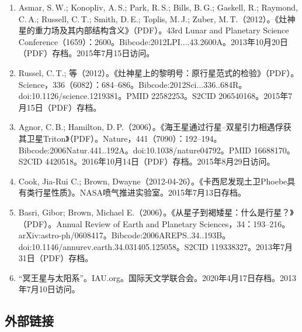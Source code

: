 \begin{enumerate}
\item Asmar, S.\,W.; Konopliv, A.\,S.; Park, R.\,S.; Bills, B.\,G.; Gaskell, R.; Raymond, C.\,A.; Russell, C.\,T.; Smith, D.\,E.; Toplis, M.\,J.; Zuber, M.\,T.（2012）。《灶神星的重力场及其内部结构含义》（PDF）。43rd Lunar and Planetary Science Conference（1659）：2600。Bibcode:2012LPI....43.2600A。2013年10月20日（PDF）存档。2015年7月15日访问。
\item Russel, C.\,T.; 等（2012）。《灶神星上的黎明号：原行星范式的检验》（PDF）。Science，336（6082）：684–686。Bibcode:2012Sci...336..684R。doi:10.1126/science.1219381。PMID 22582253。S2CID 206540168。2015年7月15日（PDF）存档。
\item Agnor, C.\,B.; Hamilton, D.\,P.（2006）。《海王星通过行星–双星引力相遇俘获其卫星Triton》（PDF）。Nature，441（7090）：192–194。Bibcode:2006Natur.441..192A。doi:10.1038/nature04792。PMID 16688170。S2CID 4420518。2016年10月14日（PDF）存档。2015年8月29日访问。
\item Cook, Jia-Rui C.; Brown, Dwayne（2012-04-26）。《卡西尼发现土卫Phoebe具有类行星性质》。NASA喷气推进实验室。2015年7月13日存档。
\item Basri, Gibor; Brown, Michael E.（2006）。《从星子到褐矮星：什么是行星？》（PDF）。Annual Review of Earth and Planetary Sciences，34：193–216。arXiv:astro-ph/0608417。Bibcode:2006AREPS..34..193B。doi:10.1146/annurev.earth.34.031405.125058。S2CID 119338327。2013年7月31日（PDF）存档。
\item “冥王星与太阳系”。IAU.org。国际天文学联合会。2020年4月17日存档。2013年7月10日访问。
\end{enumerate}
\subsection{外部链接}

